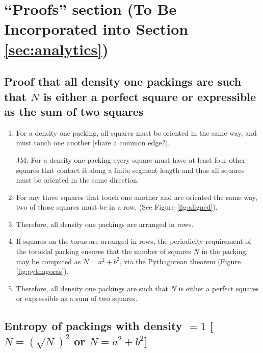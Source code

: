  
\section{``Proofs'' section (To Be Incorporated into Section \ref{sec:analytics})}

\subsection{Proof that all density one packings are such that $N$ is either a perfect square or expressible as the sum of two squares}

\begin{enumerate}
\item For a density one packing, all squares must be oriented in the same way, and must touch one another [share a common edge?].

JM:  For a density one packing every square must have at least four other squares that contact it along a finite segment length and thus all squares must be oriented in the same direction.

\item For any three squares that touch one another and are oriented the same way, two of those squares must be in a row. (See Figure \ref{fig:aligned}).

\item Therefore, all density one packings are arranged in rows.

\item If squares on the torus are arranged in rows, the periodicity requirement of the toroidal packing ensures that the number of squares $N$ in the packing may be computed as $N=a^2+b^2$, via the Pythagorean theorem (Figure \ref{fig:pythagoras}).

\item Therefore, all density one packings are such that $N$ is either a perfect squares or expressible as a sum of two squares.
\end{enumerate}


\subsection{Entropy of packings with density $=1$ [$N=( \sqrt N)^2$ or $N=a^2+b^2$]}

